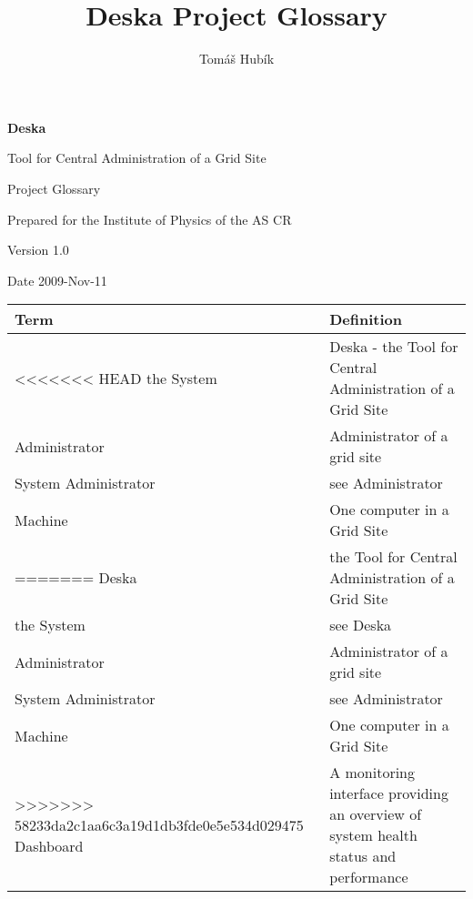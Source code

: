 \documentclass[12pt]{article}
\author{Tomáš Hubík}
\title{Deska Project Glossary}
\begin{document}
{\Huge \textbf{Deska}}

\vspace{0.2in}

{\large Tool for Central Administration of a Grid Site}

\vspace{0.5in}

{\large Project Glossary}

\vspace{0.2in}

{\large Prepared for the Institute of Physics of the AS CR}

\vspace{0.2in}

{\large Version 1.0}

\vspace{0.2in}

{\large Date 2009-Nov-11}

\vspace{0.5in}


\begin{center}
	\begin{tabular}{| p{5cm} | p{10cm} |}
		\hline
		\textbf{Term} & \textbf{Definition}\\
		\hline
<<<<<<< HEAD
	the System	& Deska - the Tool for Central Administration of a Grid Site \\
	\hline
	Administrator & Administrator of a grid site\\
	\hline
	System Administrator & see Administrator\\
	\hline
	Machine		& One computer in a Grid Site\\
	\hline
=======
	Deska		& the Tool for Central Administration of a Grid Site\\
	the System	& see Deska\\
	Administrator	& Administrator of a grid site\\
	System Administrator & see Administrator\\
	Machine		& One computer in a Grid Site\\
>>>>>>> 58233da2c1aa6c3a19d1db3fde0e5e534d029475
	Dashboard	& A monitoring interface providing an overview of system health status and performance\\
		\hline
	\end{tabular}
	\label{tab:ProjectGlossary}
\end{center}
\end{document}
